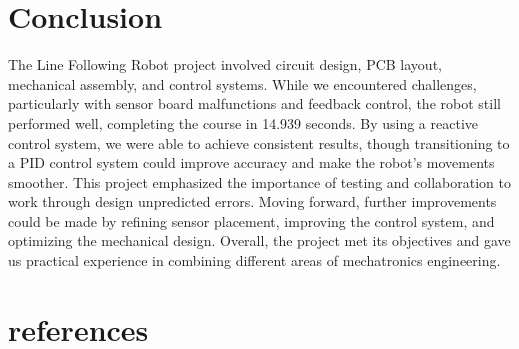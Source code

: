 \documentclass{article}
\begin{document}



\section{Conclusion}
 The Line Following Robot project involved circuit design, PCB layout, mechanical assembly, and control systems. While we encountered challenges, particularly with sensor board malfunctions and feedback control, the robot still performed well, completing the course in 14.939 seconds. By using a reactive control system, we were able to achieve consistent results, though transitioning to a PID control system could improve accuracy and make the robot’s movements smoother. This project emphasized the importance of testing and collaboration to work through design unpredicted errors. Moving forward, further improvements could be made by refining sensor placement, improving the control system, and optimizing the mechanical design. Overall, the project met its objectives and gave us practical experience in combining different areas of mechatronics engineering.

\newpage
\section{references} %


\newpage

\end{document}
